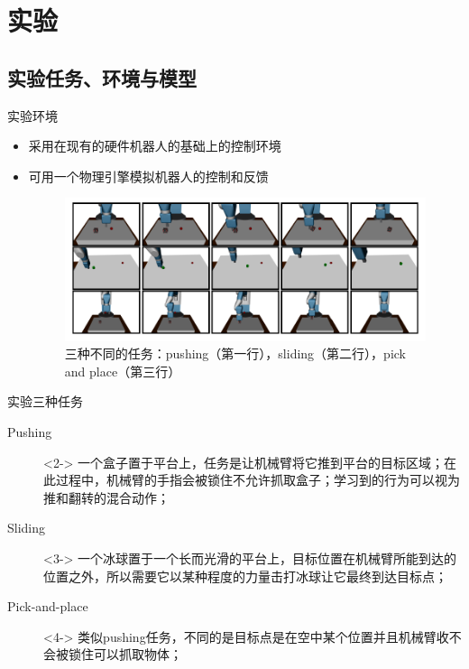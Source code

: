 \documentclass[10pt]{beamer}
\begin{document}
	\section{实验}
	
	\subsection{实验任务、环境与模型}
	
	\begin{frame}{实验}{环境}
		\begin{itemize}
			\item 采用在现有的硬件机器人的基础上的控制环境
			\item 可用一个物理引擎模拟机器人的控制和反馈
				\begin{figure}
					\centering
					\includegraphics[width=0.8\linewidth]{pictures/her-robot}
					\caption{三种不同的任务：pushing（第一行），sliding（第二行），pick and place（第三行）}
					\label{fig:her-robot}
				\end{figure}
				
		\end{itemize}
	\end{frame}

	\begin{frame}{实验}{三种任务}
		\begin{description}
			\item[Pushing]<2-> 一个盒子置于平台上，任务是让机械臂将它推到平台的目标区域；在此过程中，机械臂的手指会被锁住不允许抓取盒子；学习到的行为可以视为推和翻转的混合动作；
			
			\item[Sliding]<3-> 一个冰球置于一个长而光滑的平台上，目标位置在机械臂所能到达的位置之外，所以需要它以某种程度的力量击打冰球让它最终到达目标点；
			
			\item[Pick-and-place]<4-> 类似pushing任务，不同的是目标点是在空中某个位置并且机械臂收不会被锁住可以抓取物体；
			
		\end{description}
	\end{frame}
\end{document}
